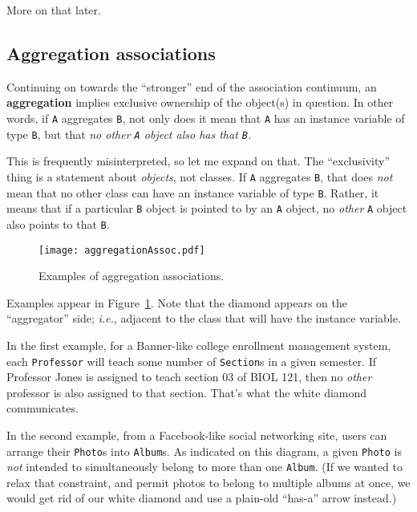 More on that later.

\subsection{Aggregation associations}

Continuing on towards the ``stronger'' end of the association continuum, an
\textbf{aggregation} implies exclusive ownership of the object(s) in question.
In other words, if \texttt{A} aggregates \texttt{B}, not only does it mean
that \texttt{A} has an instance variable of type \texttt{B}, but that
\textit{no other \texttt{A} object also has that \texttt{B}.}

This is frequently misinterpreted, so let me expand on that. The
``exclusivity'' thing is a statement about \textit{objects}, not classes. If
\texttt{A} aggregates \texttt{B}, that does \textit{not} mean that no other
class can have an instance variable of type \texttt{B}. Rather, it means that
if a particular \texttt{B} object is pointed to by an \texttt{A} object, no
\textit{other} \texttt{A} object also points to that \texttt{B}.

\begin{figure}[ht]
\centering
\texttt{[image: aggregationAssoc.pdf]}   %
\caption{Examples of aggregation associations.}
\label{fig:aggregationAssoc}
\end{figure}

Examples appear in Figure~\ref{fig:aggregationAssoc}. Note that the diamond
appears on the ``aggregator'' side; \textit{i.e.}, adjacent to the class that
will have the instance variable.

In the first example, for a Banner-like college enrollment management system,
each \texttt{Professor} will teach some number of \texttt{Section}s in a given
semester. If Professor Jones is assigned to teach section 03 of BIOL 121, then
no \textit{other} professor is also assigned to that section. That's what the
white diamond communicates.

In the second example, from a Facebook-like social networking site, users can
arrange their \texttt{Photo}s into \texttt{Album}s. As indicated on this
diagram, a given \texttt{Photo} is \textit{not} intended to simultaneously
belong to more than one \texttt{Album}. (If we wanted to relax that
constraint, and permit photos to belong to multiple albums at once, we would
get rid of our white diamond and use a plain-old ``has-a'' arrow instead.)

